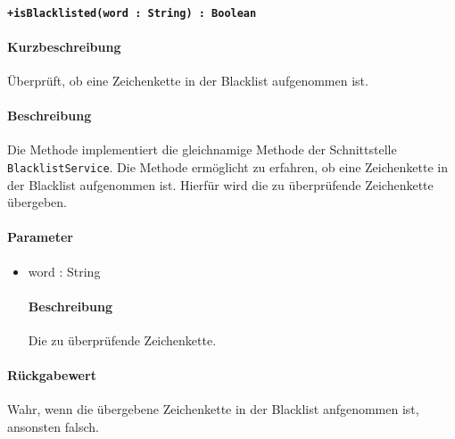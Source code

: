 \paragraph*{\texttt{+isBlacklisted(word : String) : Boolean}}%
\paragraph*{Kurzbeschreibung}
Überprüft, ob eine Zeichenkette in der Blacklist aufgenommen ist.
\paragraph*{Beschreibung}
Die Methode implementiert die gleichnamige Methode der Schnittstelle \texttt{BlacklistService}.
Die Methode ermöglicht zu erfahren, ob eine Zeichenkette in der Blacklist aufgenommen ist.
Hierfür wird die zu überprüfende Zeichenkette übergeben.
\paragraph*{Parameter}
\begin{itemize}
    \item word : String
    		\paragraph*{Beschreibung}
    		Die zu überprüfende Zeichenkette.
\end{itemize}
\paragraph*{Rückgabewert}
Wahr, wenn die übergebene Zeichenkette in der Blacklist anfgenommen ist, ansonsten falsch.
